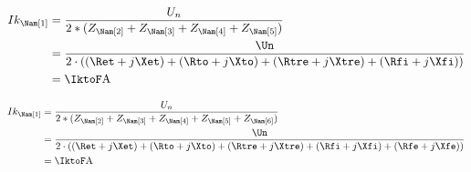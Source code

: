 {\FPeval\Ztretest{\Rfe + \Xfe + \yepET + \yepTO + \yepTRE + \yepFI}
\FPifzero{\Ztretest}
\begin{align*}
Ik_{\Nam[1]} &= \frac{U_n}{2 * (Z_{\Nam[2]} + Z_{\Nam[3]} + Z_{\Nam[4]} + Z_{\Nam[5]})} \\
	&= \frac{\Un}{2 \cdot ((\Ret + j\Xet) + (\Rto + j\Xto) + (\Rtre + j\Xtre) + (\Rfi + j\Xfi))}\\
	&= \IktoF \unit{A}
\end{align*}
\else
\FPeval{}
\fi

\FPeval\all{\yepET + \yepTO + \yepTRE + \yepFI + \yepFE}
\FPifzero{\all}
\begin{align*}
Ik_{\Nam[1]} &= \frac{U_n}{2 * (Z_{\Nam[2]} + Z_{\Nam[3]} + Z_{\Nam[4]} + Z_{\Nam[5]} + Z_{\Nam[6]})} \\
	&= \frac{\Un}{2 \cdot ((\Ret + j\Xet) + (\Rto + j\Xto) + (\Rtre + j\Xtre) + (\Rfi + j\Xfi) + (\Rfe + j\Xfe))}\\
	&= \IktoF \unit{A}
\end{align*}
\else
\fi
}


